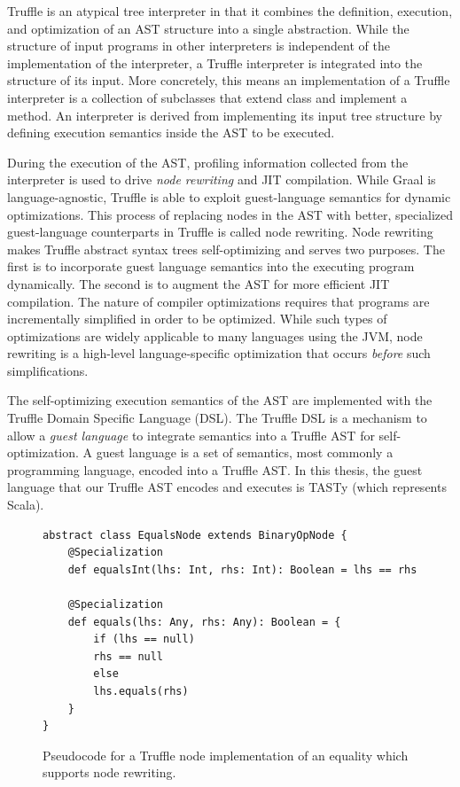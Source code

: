 Truffle is an atypical tree interpreter in that it combines the definition, execution, and optimization of an AST structure into a single abstraction.
While the structure of input programs in other interpreters is independent of the implementation of the interpreter, a Truffle interpreter is integrated into the structure of its input.
More concretely, this means an implementation of a Truffle interpreter is a collection of subclasses that extend  class and implement a  method.
An interpreter is derived from implementing its input tree structure by defining execution semantics inside the AST to be executed.

During the execution of the AST, profiling information collected from the interpreter is used to drive \textit{node rewriting} and JIT compilation.
While Graal is language-agnostic, Truffle is able to exploit guest-language semantics for dynamic optimizations.
This process of replacing nodes in the AST with better, specialized guest-language counterparts in Truffle is called node rewriting.
Node rewriting makes Truffle abstract syntax trees self-optimizing and serves two purposes.
The first is to incorporate guest language semantics into the executing program dynamically.
The second is to augment the AST for more efficient JIT compilation.
The nature of compiler optimizations requires that programs are incrementally simplified in order to be optimized.
While such types of optimizations are widely applicable to many languages using the JVM, node rewriting is a high-level language-specific optimization that occurs \textit{before} such simplifications.

The self-optimizing execution semantics of the AST are implemented with the Truffle Domain Specific Language (DSL).
The Truffle DSL is a mechanism to allow a \textit{guest language} to integrate semantics into a Truffle AST for self-optimization.
A guest language is a set of semantics, most commonly a programming language, encoded into a Truffle AST.
In this thesis, the guest language that our Truffle AST encodes and executes is TASTy (which represents Scala).

\begin{figure}[!htb]
\begin{verbatim}
abstract class EqualsNode extends BinaryOpNode {
	@Specialization
	def equalsInt(lhs: Int, rhs: Int): Boolean = lhs == rhs
	
	@Specialization
	def equals(lhs: Any, rhs: Any): Boolean = {
		if (lhs == null) 
		rhs == null 
		else 
		lhs.equals(rhs)
	}
}
\end{verbatim}
\caption{Pseudocode for a Truffle node implementation of an equality which supports node rewriting.}
\label{example:node-rewriting}
\end{figure}


